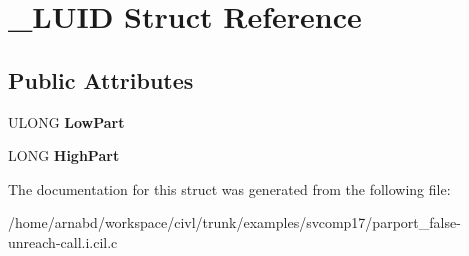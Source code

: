 \hypertarget{struct__LUID}{}\section{\+\_\+\+L\+U\+I\+D Struct Reference}
\label{struct__LUID}
\subsection*{Public Attributes}
\begin{DoxyCompactItemize}
\item 
\hypertarget{struct__LUID_ae38c0f613c270efb021fd5d1c25ed82d}{}U\+L\+O\+N\+G {\bfseries Low\+Part}\label{struct__LUID_ae38c0f613c270efb021fd5d1c25ed82d}

\item 
\hypertarget{struct__LUID_a0e9710aebde2d7edbf152dc68fe549ac}{}L\+O\+N\+G {\bfseries High\+Part}\label{struct__LUID_a0e9710aebde2d7edbf152dc68fe549ac}

\end{DoxyCompactItemize}


The documentation for this struct was generated from the following file\+:\begin{DoxyCompactItemize}
\item 
/home/arnabd/workspace/civl/trunk/examples/svcomp17/parport\+\_\+false-\/unreach-\/call.\+i.\+cil.\+c\end{DoxyCompactItemize}

